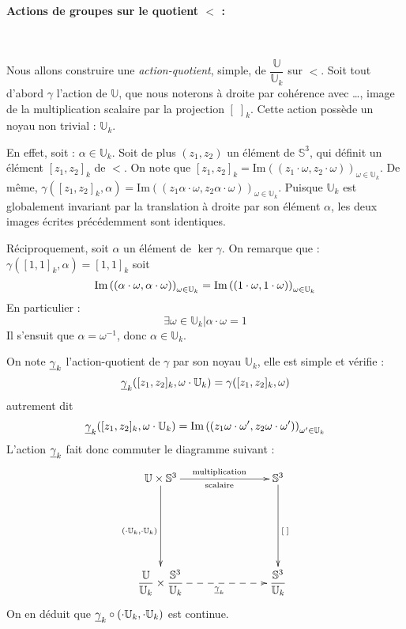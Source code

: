 \paragraph{Actions de groupes sur le quotient $\lt$ :}~\\
\par
Nous allons construire une \emph{action-quotient}, simple, de $\dfrac{\mathbb{U}}{\mathbb{U}_k}$ sur $\lt$. Soit tout d'abord $\gamma$ l'action de $\mathbb{U}$, %
que nous noterons \`a droite par coh\'erence avec \dots , image de la multiplication scalaire par la projection $[\; ]_k$. Cette action poss\`ede un noyau non trivial : $\mathbb{U}_k$.
\par
En effet, soit : $\alpha\in\mathbb{U}_k$. Soit de plus $(z_1,z_2)$ un \'el\'ement de $\mathbb{S}^3$, qui d\'efinit un \'el\'ement $[z_1,z_2]_k$ de $\lt$. %
On note que $[z_1,z_2]_k=\text{Im}((z_1\cdot\omega ,z_2\cdot\omega ))_{\omega\in\mathbb{U}_k}$. %
De m\^eme, $\gamma ([z_1,z_2]_k,\alpha)=\text{Im}((z_1\alpha\cdot\omega ,z_2\alpha\cdot\omega ))_{\omega\in\mathbb{U}_k}$. %
Puisque $\mathbb{U}_k$ est globalement invariant par la translation \`a droite par son \'el\'ement $\alpha$, les deux images \'ecrites pr\'ec\'edemment sont identiques.
\par
R\'eciproquement, soit $\alpha$ un \'el\'ement de $\ker\gamma$. On remarque que : $\gamma([1,1]_k,\alpha)=[1,1]_k$ soit
\[\pl{\alpha}{\alpha}=\pl{1}{1}\]
En particulier : \[\exists\omega\in\mathbb{U}_k|\alpha\cdot\omega=1\]
Il s'ensuit que $\alpha=\omega^{-1}$, donc $\alpha\in\mathbb{U}_k$.
\par
On note $\gk$ l'action-quotient de $\gamma$ par son noyau $\mathbb{U}_k$, elle est simple et v\'erifie :
\[\gk([z_1,z_2]_k,\omega\cdot\mathbb{U}_k)=\gamma([z_1,z_2]_k,\omega)\]
autrement dit
\[\gk([z_1,z_2]_k,\omega\cdot\mathbb{U}_k)=\pl[\omega ']{z_1\omega}{z_2\omega}\]
L'action $\gk$ fait donc commuter le diagramme suivant :
\[%
\xymatrixrowsep{1in}              %
\xymatrixcolsep{1in}
\xymatrix%
{%
\mathbb{U}\times\mathbb{S}^3\ar[d]_{\left(\cdot\mathbb{U}_k,\cdot\mathbb{U}_k\right)}\ar[r]_{\text{scalaire}}^{\text{multiplication}}&\mathbb{S}^3\ar[d]^{[\; ]}\\%
\dfrac{\mathbb{U}}{\mathbb{U}_k}\times\lt\ar@{-->}[r]_{\gk}&\lt%
}%
\]
On en d\'eduit que $\gk\circ \left(\cdot\mathbb{U}_k,\cdot\mathbb{U}_k\right)$ est continue. %

